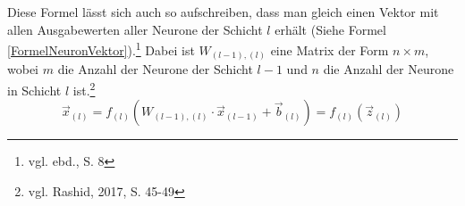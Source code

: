 \documentclass[a4paper,12pt,ngerman,oneside]{scrreprt}	%
\begin{document}
		 Diese Formel lässt sich auch so aufschreiben, dass man gleich einen Vektor mit allen Ausgabewerten aller Neurone der Schicht $l$ erhält (Siehe Formel \ref{FormelNeuronVektor}).\footnote{vgl. ebd., S. 8} Dabei ist $W_{(l-1),(l)}$ eine Matrix der Form $n\times m$, wobei $m$ die Anzahl der Neurone der Schicht $l-1$ und $n$ die Anzahl der Neurone in Schicht $l$ ist.\footnote{vgl. Rashid, 2017, S. 45-49}
		 	\begin{equation}\label{FormelNeuronVektor}
			 	\vec{x}_{(l)} = f_{(l)}(W_{(l-1),(l)} \cdot \vec{x}_{(l-1)} + \vec{b}_{(l)})  = f_{(l)}(\vec{z}_{(l)})
		 	\end{equation}


			
\end{document}
